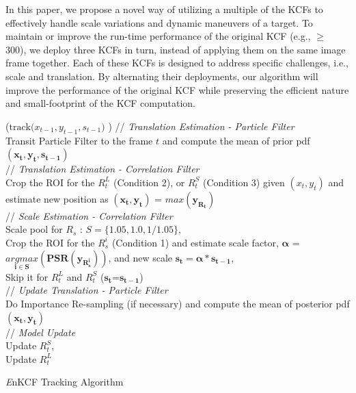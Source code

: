 \documentclass[10pt,twocolumn,letterpaper]{article}
\begin{document}
In this paper, we propose a novel way of utilizing a multiple of the
KCFs \cite{henriques2015high} to effectively handle scale variations
and dynamic maneuvers of a target. To maintain or improve the run-time
performance of the original KCF (e.g., $\ge$ 300), we deploy three
KCFs in turn, instead of applying them on the same image frame
together. Each of these KCFs is designed to address specific
challenges, i.e., scale and translation. By alternating their
deployments, our algorithm will improve the performance of the
original KCF while preserving the efficient nature and small-footprint
of the KCF computation.

\begin{algorithm*}[h]
\small
\DontPrintSemicolon
{}
\Begin($\text{track($x_{t-1},y_{t-1},s_{t-1}$) }$)
{
 	// \textit{Translation Estimation - Particle Filter} \\
	Transit Particle Filter to the frame $t$ and compute the mean of prior pdf $\mathbf{(x_{t},y_{t},s_{t-1})}$ \\
     // \textit{Translation Estimation - Correlation Filter} \\
	Crop the ROI for the $R_{t}^{L}$ (Condition 2), or $R_{t}^{S}$ (Condition 3) given $(x_{t},y_{t})$ and estimate new position as $\mathbf{(x_{t},y_{t})}$ = $\mathbf{\textit{max}(y_{R_{t}})}$\\
	// \textit{Scale Estimation - Correlation Filter}\\
	Scale pool for $R_{s}$ : $S = \lbrace1.05,1.0,1/1.05\rbrace$,\\
	Crop the ROI for the $R_{s}^{i}$ (Condition 1) and estimate scale factor, $\mathbf{\alpha}$ = $\mathbf{\underset{i\in S}{\textit{argmax}}(PSR(y_{R_{s}^{i}}))}$, and new scale $\mathbf{s_{t} = \alpha * s_{t-1}}$,\\ 
	Skip it for $R_{t}^{L}$ and $R_{t}^{S}$ ($\mathbf{s_{t}}$=$\mathbf{s_{t-1}}$)\\
	// \textit{Update Translation - Particle Filter}\\
	Do Importance Re-sampling (if necessary) and compute the 
	mean of posterior pdf $\mathbf{(x_{t},y_{t})}$\\
	// \textit{Model Update}\\
	Update $R_{t}^{S}$,\\
	Update $R_{t}^{L}$\\
  \label{endfor}
}
\caption{{\it E}nKCF Tracking Algorithm}\label{alg:MKCF}
\end{algorithm*}
\end{document}
